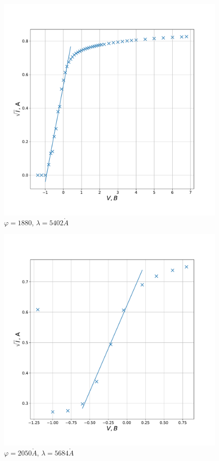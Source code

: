 \documentclass[a4paper, 12pt]{article}
\renewcommand{\phi}{\varphi}
\renewcommand{\AA}{\ensuremath{\mathring{A}}}
\begin{document}
\begin{figure}[!h]
    \centering
    \includegraphics[scale=0.35]{1880}
    \caption {$\phi = 1880$, $\lambda = 5402 \AA$}
\end{figure}

\begin{figure}[!h]
    \centering
    \includegraphics[scale=0.35]{2050}
    \caption {$\phi = 2050 \AA$, $\lambda = 5684 \AA$}
\end{figure}
\end{document}
